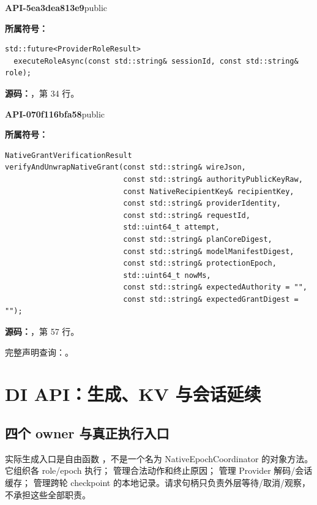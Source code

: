 \textbf{API-5ea3dea813e9}\quad public\par
\textbf{所属符号：}\par
\begin{Verbatim}[fontsize=\footnotesize,breaklines,breakanywhere]
std::future<ProviderRoleResult>
  executeRoleAsync(const std::string& sessionId, const std::string& role);
\end{Verbatim}
\textbf{源码：}，第 34 行。\par

\textbf{API-070f116bfa58}\quad public\par
\textbf{所属符号：}\par
\begin{Verbatim}[fontsize=\footnotesize,breaklines,breakanywhere]
NativeGrantVerificationResult
verifyAndUnwrapNativeGrant(const std::string& wireJson,
                           const std::string& authorityPublicKeyRaw,
                           const NativeRecipientKey& recipientKey,
                           const std::string& providerIdentity,
                           const std::string& requestId,
                           std::uint64_t attempt,
                           const std::string& planCoreDigest,
                           const std::string& modelManifestDigest,
                           const std::string& protectionEpoch,
                           std::uint64_t nowMs,
                           const std::string& expectedAuthority = "",
                           const std::string& expectedGrantDigest = "");
\end{Verbatim}
\textbf{源码：}，第 57 行。\par

完整声明查询：。

\section{DI API：生成、KV 与会话延续}

\subsection{四个 owner 与真正执行入口}
实际生成入口是自由函数 ，不是一个名为 NativeEpochCoordinator 的对象方法。它组织各 role/epoch 执行； 管理合法动作和终止原因； 管理 Provider 解码/会话缓存； 管理跨轮 checkpoint 的本地记录。请求句柄只负责外层等待/取消/观察，不承担这些全部职责。

